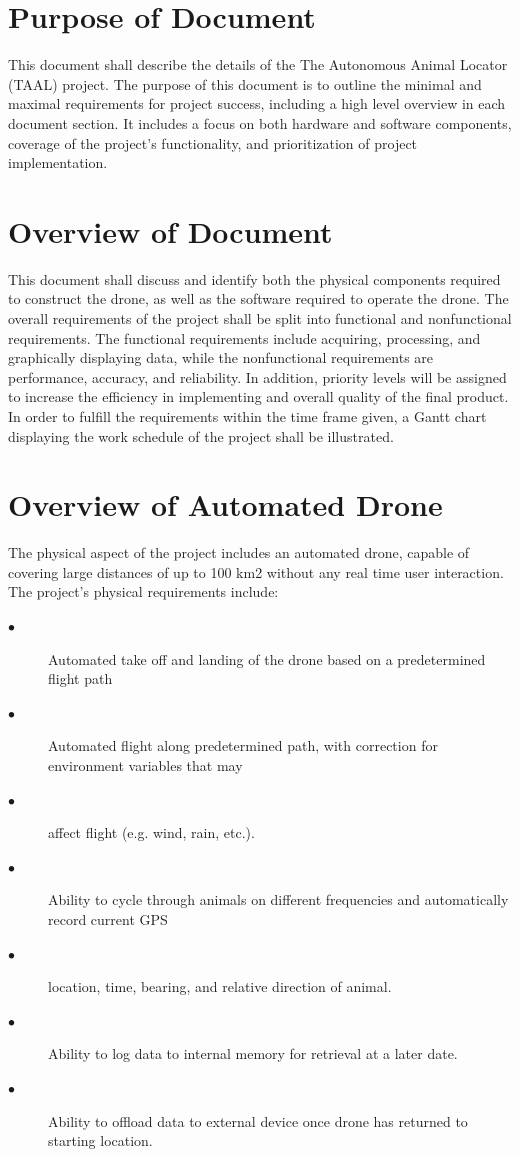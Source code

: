 \documentclass[onecolumn, draftclsnofoot,10pt, compsoc]{IEEEtran}
\begin{document}
\section{Purpose of Document}
This document shall describe the details of the The Autonomous Animal Locator (TAAL) project. The purpose of this document is to outline the minimal and maximal requirements for project success, including a high level overview in each document section. It includes a focus on both hardware and software components, coverage of the project’s functionality, and prioritization of project implementation.

\section{Overview of Document}
This document shall discuss and identify both the physical components required to construct the drone, as well as the software required to operate the drone. The overall requirements of the project shall be split into functional and nonfunctional requirements. The functional requirements include acquiring, processing, and graphically displaying data, while the nonfunctional requirements are performance, accuracy, and reliability. In addition, priority levels will be assigned to increase the efficiency in implementing and overall quality of the final product. In order to fulfill the requirements within the time frame given, a Gantt chart displaying the work schedule of the project shall be illustrated.

\section{Overview of Automated Drone}
The physical aspect of the project includes an automated drone, capable of covering large distances of up to 100 km2 without any real time user interaction. The project’s physical requirements include:

\begin{description}
\item[$\bullet$] Automated take off and landing of the drone based on a predetermined flight path
\item[$\bullet$] Automated flight along predetermined path, with correction for environment variables that may \item[$\bullet$] affect flight (e.g. wind, rain, etc.).
\item[$\bullet$] Ability to cycle through animals on different frequencies and automatically record current GPS 
\item[$\bullet$] location, time, bearing, and relative direction of animal.
\item[$\bullet$] Ability to log data to internal memory for retrieval at a later date.
\item[$\bullet$] Ability to offload data to external device once drone has returned to starting location.
\end{description}
\end{document}
